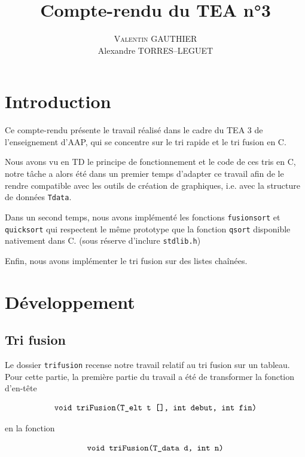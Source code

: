\documentclass[11pt]{article}
\title{Compte-rendu du TEA n°3}
\author{\textsc{Valentin GAUTHIER}\\ Alexandre TORRES--LEGUET}
\begin{document}
\maketitle

\section{Introduction}

\quad \quad Ce compte-rendu présente le travail réalisé dans le cadre du TEA 3 de l'enseignement d'AAP, qui se concentre sur le tri rapide et le tri fusion en \textsc{C}.
 
Nous avons vu en TD le principe de fonctionnement et le code de ces tris en \textsc{C}, notre tâche a alors été dans un premier temps d'adapter ce travail afin de le rendre compatible avec les outils de création de graphiques, i.e. avec la structure de données \texttt{T\textunderscore data}. 

Dans un second temps, nous avons implémenté les fonctions \texttt{fusionsort} et \texttt{quicksort} qui respectent le même prototype que la fonction \texttt{qsort} disponible nativement dans \textsc{C}. (sous réserve d'inclure \texttt{stdlib.h})

Enfin, nous avons implémenter le tri fusion sur des listes chaînées.



\section{Développement}

\subsection{Tri fusion}

\quad \quad Le dossier \texttt{tri\textunderscore fusion} recense notre travail relatif au tri fusion sur un tableau. \\

Pour cette partie, la première partie du travail a été de transformer la fonction d'en-tête

$$
\texttt{void triFusion(T\textunderscore elt t [], int debut, int fin)}
$$

en la fonction

$$
\texttt{void triFusion(T\textunderscore data d, int n)}
$$
\end{document}
